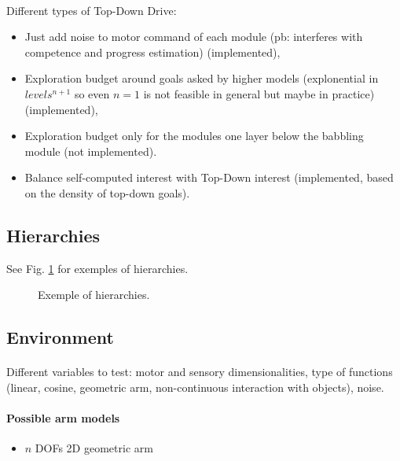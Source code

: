 \documentclass[conference]{include/IEEEtran}
\begin{document}
		\paragraph{}
		Different types of Top-Down Drive:
		\begin{itemize}
			\item Just add noise to motor command of each module (pb: interferes with competence and progress estimation)  (implemented),
			\item Exploration budget around goals asked by higher models (explonential in $levels^{n+1}$ so even $n=1$ is not feasible in general but maybe in practice)  (implemented),
			\item Exploration budget only for the modules one layer below the babbling module (not implemented).
			\item Balance self-computed interest with Top-Down interest (implemented, based on the density of top-down goals).
		\end{itemize}
		
	
	
	\subsection{Hierarchies}
	
		See Fig. \ref{Hierarchies} for exemples of hierarchies.
	
		\begin{figure*}[!t]
			\centerline{\subfloat[]{}
			\subfloat[]{}
			\subfloat[]{}
			\subfloat[]{}}
			\caption{Exemple of hierarchies.}
			\label{Hierarchies}					
		\end{figure*}
	
	
	\subsection{Environment}
	
		\paragraph{}
		Different variables to test: motor and sensory dimensionalities, type of functions (linear, cosine, geometric arm, non-continuous interaction with objects), noise.
		
		\paragraph{Possible arm models}
		\begin{itemize}
			\item $n$ DOFs 2D geometric arm
		\end{itemize}
		
\end{document}
